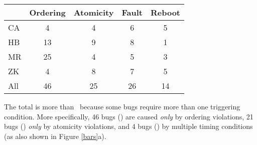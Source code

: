 

\begin{table}[t]
\small
\centering
\begin{tabular}{lcccc}
\toprule
   & Ordering & Atomicity & Fault & Reboot \\
\midrule
CA &  4  & 4 & 6 & 5 \\
HB &  13  & 9 & 8 & 1 \\
MR & 25  & 4 & 5 & 3 \\
ZK &  4  & 8 & 7 & 5 \\
\midrule
All &  46  & 25 & 26 & 14 \\
\bottomrule
\end{tabular}

{The total is more than \numDcBugs\ because some bugs
require more than one triggering condition. More specifically, 46 bugs 
(\pctTrigOrder) are caused {\em only} by 
ordering violations, 21 bugs (\pctTrigAtom) 
{\em only} by atomicity violations, and 4 bugs (\pctTrigMix) by multiple timing 
conditions (as also shown in Figure \ref{bars}a).}

\end{table}

